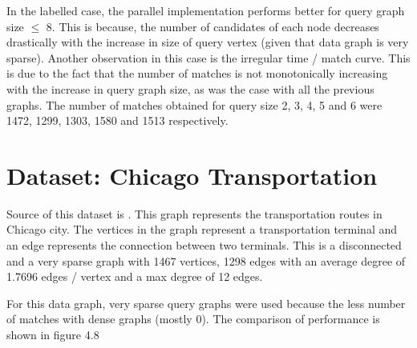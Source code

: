 In the labelled case, the parallel implementation performs better for query graph size $\leq$ 8. This is because, the number of candidates of each node decreases drastically with the increase in size of query vertex (given that data graph is very sparse). Another observation in this case is the irregular time / match curve. This is due to the fact that the number of matches is not monotonically increasing with the increase in query graph size, as was the case with all the previous graphs. The number of matches obtained for query size 2, 3, 4, 5 and 6 were 1472, 1299, 1303, 1580 and 1513 respectively.

\section{Dataset: Chicago Transportation}

Source of this dataset is \cite{chicago}. This graph represents the transportation routes in Chicago city. The vertices in the graph represent a transportation terminal and an edge represents the connection between two terminals. This is a disconnected and a very sparse graph with 1467 vertices, 1298 edges with an average degree of 1.7696 edges / vertex and a max degree of 12 edges.

For this data graph, very sparse query graphs were used because the less number of matches with dense graphs (mostly 0). The comparison of performance is shown in figure 4.8

